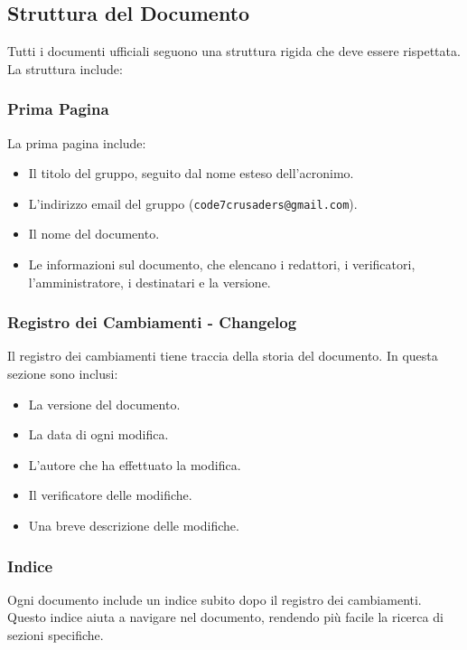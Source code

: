 \subsection{Struttura del Documento}

Tutti i documenti ufficiali seguono una struttura rigida che deve essere rispettata. La struttura include:

\subsubsection{Prima Pagina}
La prima pagina include:
\begin{itemize}
    \item Il titolo del gruppo, seguito dal nome esteso dell’acronimo.
    \item L'indirizzo email del gruppo (\texttt{code7crusaders@gmail.com}).
    \item Il nome del documento.
    \item Le informazioni sul documento, che elencano i redattori, i verificatori, l’amministratore, i destinatari e la versione.
\end{itemize}

\subsubsection{Registro dei Cambiamenti - Changelog}
Il registro dei cambiamenti tiene traccia della storia del documento. In questa sezione sono inclusi:
\begin{itemize}
    \item La versione del documento.
    \item La data di ogni modifica.
    \item L'autore che ha effettuato la modifica.
    \item Il verificatore delle modifiche.
    \item Una breve descrizione delle modifiche.
\end{itemize}

\subsubsection{Indice}
Ogni documento include un indice subito dopo il registro dei cambiamenti. 
Questo indice aiuta a navigare nel documento, rendendo più facile la ricerca di sezioni specifiche.

